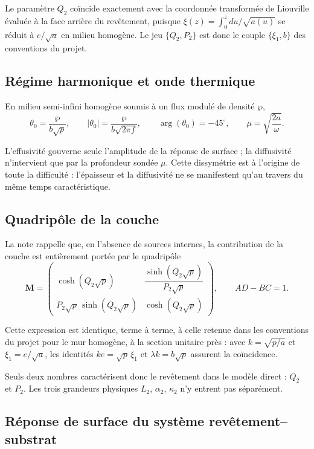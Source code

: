 \documentclass[11pt,a4paper]{article}
\begin{document}
Le paramètre $Q_{2}$ coïncide exactement avec la coordonnée transformée de Liouville évaluée à la face
arrière du revêtement, puisque $\xi(z)=\int_{0}^{z}du/\sqrt{a(u)}$ se réduit à $e/\sqrt{a}$ en milieu
homogène. Le jeu $\{Q_{2},P_{2}\}$ est donc le couple $\{\xi_{1},b\}$ des conventions du projet.

\subsection{Régime harmonique et onde thermique}

En milieu semi-infini homogène soumis à un flux modulé de densité $\wp$,
\[ \theta_{0} = \frac{\wp}{b\sqrt{p}} , \qquad
|\theta_{0}| = \frac{\wp}{b\sqrt{2\pi f}} , \qquad \arg(\theta_{0}) = -45^{\circ} , \qquad
\mu = \sqrt{\frac{2a}{\omega}} . \]

L'effusivité gouverne seule l'amplitude de la réponse de surface ; la diffusivité n'intervient que par
la profondeur sondée $\mu$. Cette dissymétrie est à l'origine de toute la difficulté : l'épaisseur et la
diffusivité ne se manifestent qu'au travers du même temps caractéristique.

\subsection{Quadripôle de la couche}

La note rappelle que, en l'absence de sources internes, la contribution de la couche est entièrement
portée par le quadripôle
\[ \mathbf{M} =
\begin{pmatrix}
\cosh\!\left(Q_{2}\sqrt{p}\right) & \dfrac{\sinh\!\left(Q_{2}\sqrt{p}\right)}{P_{2}\sqrt{p}} \\[10pt]
P_{2}\sqrt{p}\,\sinh\!\left(Q_{2}\sqrt{p}\right) & \cosh\!\left(Q_{2}\sqrt{p}\right)
\end{pmatrix} ,
\qquad AD-BC = 1 . \]

Cette expression est identique, terme à terme, à celle retenue dans les conventions du projet pour le
mur homogène, à la section unitaire près : avec $k=\sqrt{p/a}$ et $\xi_{1}=e/\sqrt{a}$, les identités
$ke=\sqrt{p}\,\xi_{1}$ et $\lambda k = b\sqrt{p}$ assurent la coïncidence.

Seuls deux nombres caractérisent donc le revêtement dans le modèle direct : $Q_{2}$ et $P_{2}$. Les
trois grandeurs physiques $L_{2}$, $\alpha_{2}$, $\kappa_{2}$ n'y entrent pas séparément.

\subsection{Réponse de surface du système revêtement--substrat}
\end{document}
